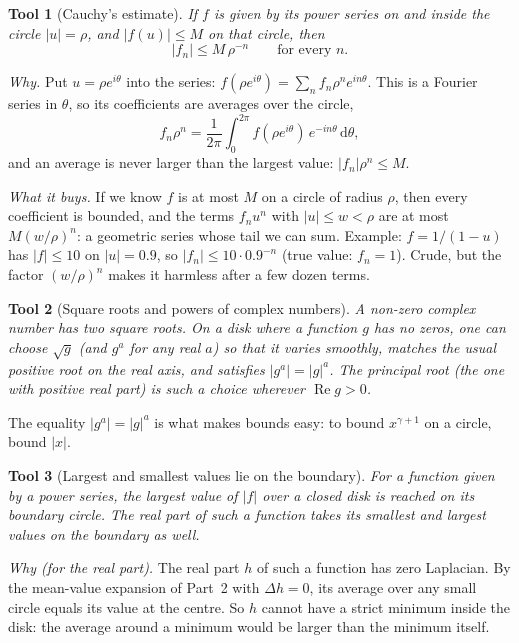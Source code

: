 \documentclass[11pt,a4paper]{article}
\newtheorem{tool}{Tool}
\theoremstyle{remark}
\newcommand{\dd}{\mathrm{d}}
\begin{document}
\begin{tool}[Cauchy's estimate]
If $f$ is given by its power series on and inside the circle $|u|=\rho$, and $|f(u)|\le M$ on that
circle, then
\[
  |f_n|\le M\,\rho^{-n}\qquad\text{for every }n.
\]
\end{tool}
\emph{Why.} Put $u=\rho e^{i\theta}$ into the series:
$f(\rho e^{i\theta})=\sum_nf_n\rho^ne^{in\theta}$. This is a Fourier series in $\theta$, so its
coefficients are averages over the circle,
\[
  f_n\rho^n=\frac{1}{2\pi}\int_0^{2\pi}f(\rho e^{i\theta})\,e^{-in\theta}\,\dd\theta ,
\]
and an average is never larger than the largest value: $|f_n|\rho^n\le M$.

\emph{What it buys.} If we know $f$ is at most $M$ on a circle of radius $\rho$, then every
coefficient is bounded, and the terms $f_nu^n$ with $|u|\le w<\rho$ are at most $M(w/\rho)^n$: a
geometric series whose tail we can sum. Example: $f=1/(1-u)$ has $|f|\le10$ on $|u|=0.9$, so
$|f_n|\le10\cdot0.9^{-n}$ (true value: $f_n=1$). Crude, but the factor $(w/\rho)^n$ makes it
harmless after a few dozen terms.

\begin{tool}[Square roots and powers of complex numbers]
A non-zero complex number has two square roots. On a disk where a function $g$ has no zeros, one
can choose $\sqrt g$ (and $g^a$ for any real $a$) so that it varies smoothly, matches the usual
positive root on the real axis, and satisfies $|g^a|=|g|^a$. The \emph{principal} root (the one
with positive real part) is such a choice wherever $\operatorname{Re}g>0$.
\end{tool}
The equality $|g^a|=|g|^a$ is what makes bounds easy: to bound $x^{\gamma+1}$ on a circle, bound
$|x|$.

\begin{tool}[Largest and smallest values lie on the boundary]
For a function given by a power series, the largest value of $|f|$ over a closed disk is reached
on its boundary circle. The real part of such a function takes its smallest and largest values on
the boundary as well.
\end{tool}
\emph{Why (for the real part).} The real part $h$ of such a function has zero Laplacian. By the
mean-value expansion of Part~2 with $\Delta h=0$, its average over any small circle equals its value
at the centre. So $h$ cannot have a strict minimum inside the disk: the average around a minimum
would be larger than the minimum itself.
\end{document}
